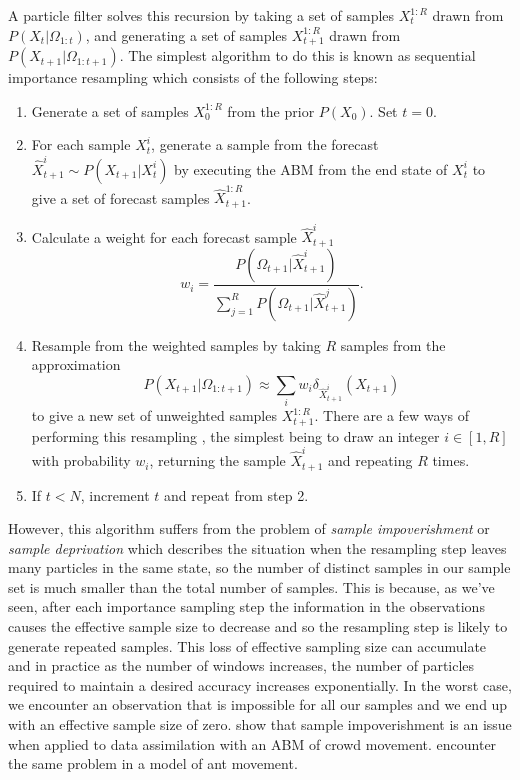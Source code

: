 \documentclass{article}
\begin{document}
A particle filter solves this recursion by taking a set of samples $X_t^{1:R}$ drawn from $P(X_t|\Omega_{1:t})$, and generating a set of samples  $X_{t+1}^{1:R}$ drawn from $P(X_{t+1}|\Omega_{1:t+1})$. The simplest algorithm to do this is known as sequential importance resampling which consists of the following steps:
\begin{enumerate}
\item Generate a set of samples $X^{1:R}_0$ from the prior $P(X_0)$. Set $t=0$.

\item For each sample $X_t^i$, generate a sample from the forecast $\hat{X}_{t+1}^i \sim P(X_{t+1}|X^i_t)$ by executing the ABM from the end state of $X^i_t$ to give a set of forecast samples $\hat{X}^{1:R}_{t+1}$.

\item Calculate a weight for each forecast sample $\hat{X}_{t+1}^i$
\[
w_i = \frac{P(\Omega_{t+1}|\hat{X}_{t+1}^i)}{\sum_{j=1}^R P(\Omega_{t+1}|\hat{X}_{t+1}^j)}.
\]

\item Resample from the weighted samples by taking $R$ samples from the approximation
\begin{equation}
P(X_{t+1}|\Omega_{1:t+1}) \approx  \sum_i w_i\delta_{\hat{X}_{t+1}^i}\left(X_{t+1}\right)
\label{importanceApprox}
\end{equation}
to give a new set of unweighted samples $X^{1:R}_{t+1}$. There are a few ways of performing this resampling \citep{douc2005comparison}, the simplest being to draw an integer $i\in[1,R]$ with probability $w_i$, returning the sample $\hat{X}_{t+1}^i$ and repeating $R$ times.

\item If $t<N$, increment $t$ and repeat from step 2.

\end{enumerate}

However, this algorithm suffers from the problem of \textit{sample impoverishment} \citep{li2014fight} or \textit{sample deprivation} which describes the situation when the resampling step leaves many particles in the same state, so the number of distinct samples in our sample set is much smaller than the total number of samples. This is because, as we've seen, after each importance sampling step the information in the observations causes the effective sample size to decrease and so the resampling step is likely to generate repeated samples. This loss of effective sampling size can accumulate and in practice as the number of windows increases, the number of particles required to maintain a desired accuracy increases exponentially. In the worst case, we encounter an observation that is impossible for all our samples and we end up with an effective sample size of zero. \citet{malleson_simulating_2020} show that sample impoverishment is an issue when applied to data assimilation with an ABM of crowd movement. \citet{khan2003efficient} encounter the same problem in a model of ant movement.
\end{document}
